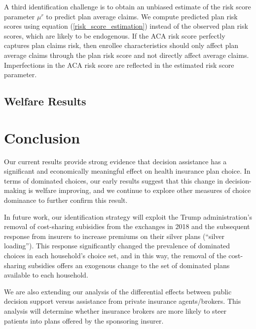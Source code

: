 \documentclass[12pt]{article}
\begin{document}
A third identification challenge is to obtain an unbiased estimate of the risk score parameter $\mu^r$ to predict plan average claims. We compute predicted plan risk scores using equation (\ref{risk_score_estimation}) instead of the observed plan risk scores, which are likely to be endogenous.   If the ACA risk score perfectly captures plan claims risk, then enrollee characteristics should only affect plan average claims through the plan risk score and not directly affect average claims.  Imperfections in the ACA risk score are reflected in the estimated risk score parameter.  



\subsection{Welfare Results}
\label{subsec:steering-results}


\section{Conclusion}
\label{sec:conclusion}

Our current results provide strong evidence that decision assistance has a significant and economically meaningful effect on health insurance plan choice. In terms of dominated choices, our early results suggest that this change in decision-making is welfare improving, and we continue to explore other measures of choice dominance to further confirm this result.

In future work, our identification strategy will exploit the Trump administration's removal of cost-sharing subisidies from the exchanges in 2018 and the subsequent response from insurers to increase premiums on their silver plans (``silver loading''). This response significantly changed the prevalence of dominated choices in each household's choice set, and in this way, the removal of the cost-sharing subsidies offers an exogenous change to the set of dominated plans available to each household.

We are also extending our analysis of the differential effects between public decision support versus assistance from private insurance agents/brokers. This analysis will determine whether insurance brokers are more likely to steer patients into plans offered by the sponsoring insurer.

\pagebreak



\clearpage
\newpage
\end{document}
